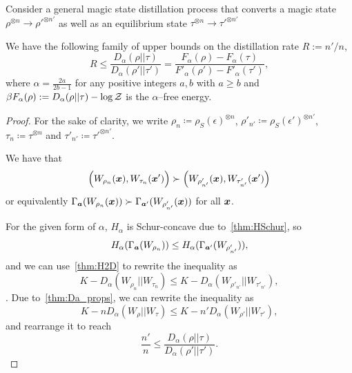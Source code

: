 \documentclass[pra,
aps,
twocolumn,
superscriptaddress,
groupedaddress,
nofootinbib,
reprint
]{revtex4-1}
\begin{document}
\begin{theorem}
	Consider a general magic state distillation process that converts a magic state $\rho^{\otimes n} \longrightarrow \rho'^{\otimes n'}$ as well as an equilibrium state $\tau^{\otimes n} \longrightarrow \tau'^{\otimes n'}$
	
	We have the following family of upper bounds on the distillation rate $R := n'/n$,
	\begin{equation}
		R \leq \frac{D_{\alpha}(\rho||\tau)}{D_{\alpha}(\rho'||\tau')} = \frac{F_\alpha(\rho) - F_\alpha( \tau)}{F'_\alpha(\rho') - F'_\alpha( \tau')},
	\end{equation}
	where $\alpha = \frac{2a}{2b-1}$ for any positive integers $a,b$ with $a \geq b$ and $\beta F_\alpha(\rho) := D_\alpha (\rho || \tau) - \log \mathcal{Z}$ is the $\alpha$--free energy. 
\end{theorem}
\begin{proof}
	For the sake of clarity, we write $\rho_n \coloneqq \rho_S(\epsilon)^{\otimes n}$, $\rho'_{n'} \coloneqq \rho_S(\epsilon')^{\otimes n'}$, $\tau_n \coloneqq \tau^{\otimes n}$ and $\tau'_{n'} \coloneqq \tau'^{\otimes n'}$.
	
	We have that 
\begin{equation}	
	\Big(W_{\rho_n}(\bm{x}), W_{\tau_n}(\bm{x}')\Big) \succ \Big(W_{\rho'_{n'}}(\bm{x}), W_{\tau'_{n'}}(\bm{x}')\Big)
\end{equation}	
or equivalently $\Gamma_{\bm{a}}(W_{\rho_n}(\bm{x})) \succ \Gamma_{\bm{a}'}(W_{\rho'_{n'}}(\bm{x}))$ for all $\bm{x}$.

For the given form of $\alpha$, $H_{\alpha}$ is Schur-concave due to~\cref{thm:HSchur}, so
\begin{equation}
	H_{\alpha}(\Gamma_{\bm{a}}(W_{\rho_n})) \leq H_{\alpha}(\Gamma_{\bm{a}'}(W_{\rho'_{n'}})),
\end{equation}
and we can use~\cref{thm:H2D} to rewrite the inequality as
\begin{equation}
	K - D_{\alpha}(W_{\rho_n} || W_{\tau_n}) \leq K - D_{\alpha}(W_{\rho'_{n'}} || W_{\tau'_{n'}}),
\end{equation}.
Due to~\cref{thm:Da_props}, we can rewrite the inequality as
\begin{equation}
	K - nD_{\alpha}(W_{\rho} || W_{\tau}) \leq K - n'D_{\alpha}(W_{\rho'} || W_{\tau'}),
\end{equation}
and rearrange it to reach
\begin{equation}
	\frac{n'}{n} \leq \frac{D_{\alpha}(\rho||\tau)}{D_{\alpha}(\rho'||\tau')}.
\end{equation}
\end{proof}
\end{document}
